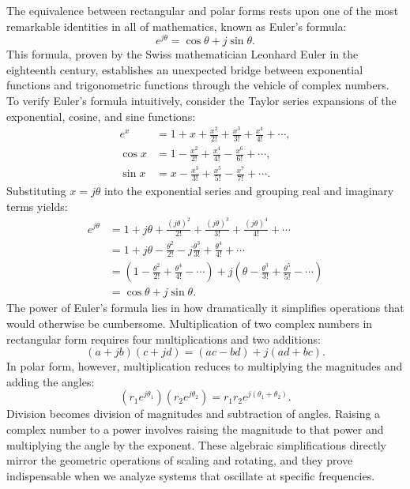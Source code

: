 The equivalence between rectangular and polar forms rests upon one of the most remarkable identities in all of mathematics, known as Euler's formula:
\begin{equation}
e^{j\theta} = \cos\theta + j\sin\theta.
\end{equation}
This formula, proven by the Swiss mathematician Leonhard Euler in the eighteenth century, establishes an unexpected bridge between exponential functions and trigonometric functions through the vehicle of complex numbers. To verify Euler's formula intuitively, consider the Taylor series expansions of the exponential, cosine, and sine functions:
\begin{align}
e^x &= 1 + x + \frac{x^2}{2!} + \frac{x^3}{3!} + \frac{x^4}{4!} + \cdots, \\
\cos x &= 1 - \frac{x^2}{2!} + \frac{x^4}{4!} - \frac{x^6}{6!} + \cdots, \\
\sin x &= x - \frac{x^3}{3!} + \frac{x^5}{5!} - \frac{x^7}{7!} + \cdots.
\end{align}
Substituting $x = j\theta$ into the exponential series and grouping real and imaginary terms yields:
\begin{align}
e^{j\theta} &= 1 + j\theta + \frac{(j\theta)^2}{2!} + \frac{(j\theta)^3}{3!} + \frac{(j\theta)^4}{4!} + \cdots \\
&= 1 + j\theta - \frac{\theta^2}{2!} - j\frac{\theta^3}{3!} + \frac{\theta^4}{4!} + \cdots \\
&= \left(1 - \frac{\theta^2}{2!} + \frac{\theta^4}{4!} - \cdots\right) + j\left(\theta - \frac{\theta^3}{3!} + \frac{\theta^5}{5!} - \cdots\right) \\
&= \cos\theta + j\sin\theta.
\end{align}
The power of Euler's formula lies in how dramatically it simplifies operations that would otherwise be cumbersome. Multiplication of two complex numbers in rectangular form requires four multiplications and two additions:
\begin{equation}
(a + jb)(c + jd) = (ac - bd) + j(ad + bc).
\end{equation}
In polar form, however, multiplication reduces to multiplying the magnitudes and adding the angles:
\begin{equation}
(r_1 e^{j\theta_1})(r_2 e^{j\theta_2}) = r_1 r_2 e^{j(\theta_1 + \theta_2)}.
\end{equation}
Division becomes division of magnitudes and subtraction of angles. Raising a complex number to a power involves raising the magnitude to that power and multiplying the angle by the exponent. These algebraic simplifications directly mirror the geometric operations of scaling and rotating, and they prove indispensable when we analyze systems that oscillate at specific frequencies.

